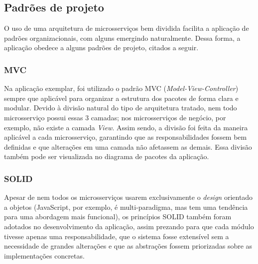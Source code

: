 \subsection{Padrões de projeto}
O uso de uma arquitetura de microsserviços bem dividida facilita a aplicação de padrões organizacionais, com alguns emergindo naturalmente. Dessa forma, a aplicação obedece a alguns padrões de projeto, citados a seguir.

\subsubsection*{MVC}
Na aplicação exemplar, foi utilizado o padrão MVC (\emph{Model-View-Controller}) sempre que aplicável para organizar a estrutura dos pacotes de forma clara e modular. Devido à divisão natural do tipo de arquitetura tratado, nem todo microsserviço possui essas 3 camadas; nos microsserviços de negócio, por exemplo, não existe a camada \emph{View}. Assim sendo, a divisão foi feita da maneira aplicável a cada microsserviço, garantindo que as responsabilidades fossem bem definidas e que alterações em uma camada não afetassem as demais. Essa divisão também pode ser visualizada no diagrama de pacotes da aplicação.

\subsubsection*{SOLID}
Apesar de nem todos os microsserviços usarem exclusivamente o \emph{design} orientado a objetos (JavaScript, por exemplo, é multi-paradigma, mas tem uma tendência para uma abordagem mais funcional), os princípios SOLID também foram adotados no desenvolvimento da aplicação, assim prezando para que cada módulo tivesse apenas uma responsabilidade, que o sistema fosse extensível sem a necessidade de grandes alterações e que as abstrações fossem priorizadas sobre as implementações concretas.


